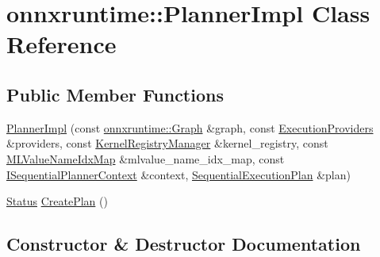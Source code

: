\hypertarget{classonnxruntime_1_1PlannerImpl}{}\section{onnxruntime\+:\+:Planner\+Impl Class Reference}
\label{classonnxruntime_1_1PlannerImpl}
\subsection*{Public Member Functions}
\begin{DoxyCompactItemize}
\item 
\mbox{\hyperlink{classonnxruntime_1_1PlannerImpl_a82104292be44d9be10b6b17de97c409d}{Planner\+Impl}} (const \mbox{\hyperlink{classonnxruntime_1_1Graph}{onnxruntime\+::\+Graph}} \&graph, const \mbox{\hyperlink{classonnxruntime_1_1ExecutionProviders}{Execution\+Providers}} \&providers, const \mbox{\hyperlink{classonnxruntime_1_1KernelRegistryManager}{Kernel\+Registry\+Manager}} \&kernel\+\_\+registry, const \mbox{\hyperlink{classonnxruntime_1_1MLValueNameIdxMap}{M\+L\+Value\+Name\+Idx\+Map}} \&mlvalue\+\_\+name\+\_\+idx\+\_\+map, const \mbox{\hyperlink{classonnxruntime_1_1ISequentialPlannerContext}{I\+Sequential\+Planner\+Context}} \&context, \mbox{\hyperlink{structonnxruntime_1_1SequentialExecutionPlan}{Sequential\+Execution\+Plan}} \&plan)
\item 
\mbox{\hyperlink{classonnxruntime_1_1common_1_1Status}{Status}} \mbox{\hyperlink{classonnxruntime_1_1PlannerImpl_ac293990d1378b99bf4e6c0fcb8ee5a23}{Create\+Plan}} ()
\end{DoxyCompactItemize}


\subsection{Constructor \& Destructor Documentation}
\mbox{\label{classonnxruntime_1_1PlannerImpl_a82104292be44d9be10b6b17de97c409d}} 
